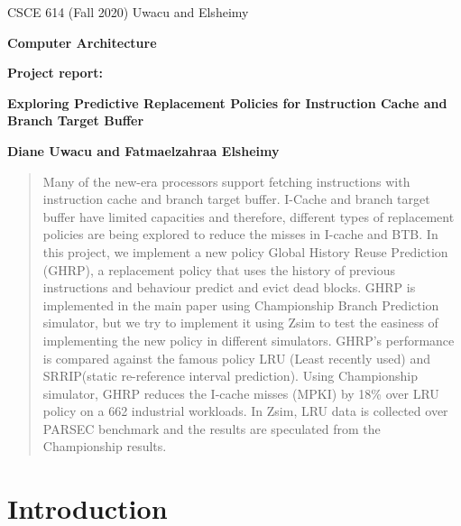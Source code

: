 \documentclass[11pt]{article}
\begin{document}

\centerline{CSCE 614 (Fall 2020) \hfill Uwacu and Elsheimy}
\medskip
\centerline{\bf Computer Architecture}
\medskip

\centerline{\bf  Project report: }

\bigskip

\centerline{\bf Exploring Predictive Replacement Policies for Instruction Cache and Branch Target Buffer}

\bigskip

\centerline{\bf Diane Uwacu and Fatmaelzahraa Elsheimy}

\bigskip

\begin{abstract}
Many of the new-era processors support fetching instructions with instruction cache and branch target buffer. I-Cache and branch target buffer have limited capacities and
therefore, different types of replacement policies are being explored to reduce the misses in I-cache and BTB. In this project, we implement a new policy Global History Reuse 
Prediction (GHRP), a replacement policy that uses the history of previous instructions and behaviour predict and evict dead blocks. GHRP is implemented in the main paper using
Championship Branch Prediction simulator, but we try to implement it using Zsim to test the easiness of implementing the new policy in different simulators. GHRP’s 
performance is compared against the famous policy LRU (Least recently used) and SRRIP(static re-reference interval prediction). Using Championship simulator, GHRP reduces the I-cache misses (MPKI) by 18\% 
over LRU policy on a 662 industrial workloads. In Zsim, LRU data is collected over PARSEC benchmark and the results are speculated from the Championship results.
\end{abstract}

\section{Introduction} 
\label{sec:introduction}
\end{document}
